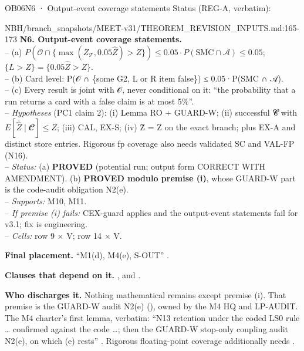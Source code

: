 \begin{card}{OB06}{N6 · Output-event coverage statements}
Status (REG-A, verbatim):  
\begin{stmt}{NBH/branch_snapshots/MEET-v31/THEOREM_REVISION_INPUTS.md:165-173}
\textbf{N6. Output-event coverage statements.}\\
– (a) $P(𝒪 ∩ \{\max(Z_{𝒯}, 0.05\hat{Z}) > Z\}) ≤ 0.05\cdot P(\mathrm{SMC} ∩ 𝒜) ≤ 0.05$; $\{L > Z\} = \{0.05\hat{Z} > Z\}$.\\
– (b) Card level: P(𝒪 ∩ \{some G2, L or R item false\}) ≤ 0.05·P(SMC ∩ 𝒜).\\
– (c) Every result is joint with 𝒪, never conditional on it: ``the probability that a run returns a card with a false claim is at most 5\%''.\\
– \emph{Hypotheses} (PC1 claim 2): (i) Lemma RO + GUARD-W; (ii) successful 𝓒 with $E[\bar{\hat{Z}} \mid 𝓒] ≤ Z$; (iii) CAL, EX-S; (iv) Ẑ = Z on the exact branch; plus EX-A and distinct store entries. Rigorous fp coverage also needs validated SC and VAL-FP (N16).\\
– \emph{Status:} (a) \textbf{PROVED} (potential run; output form CORRECT WITH AMENDMENT). (b) \textbf{PROVED modulo premise (i)}, whose GUARD-W part is the code-audit obligation N2(e).\\
– \emph{Supports:} M10, M11.\\
– \emph{If premise (i) fails:} CEX-guard applies and the output-event statements fail for v3.1; fix is engineering.\\
– \emph{Cells:} row 9 × V; row 14 × V.
\end{stmt}
\textbf{Final placement.} ``M1(d), M4(e), S-OUT'' .

\textbf{Clauses that depend on it.} ,  and .

\textbf{Who discharges it.} Nothing mathematical remains except premise (i). That premise is the GUARD-W audit N2(e) (), owned by the M4 HQ and LP-AUDIT. The M4 charter's first lemma, verbatim: ``N13 retention under the coded LS0 rule \ldots{} confirmed against the code \ldots; then the GUARD-W stop-only coupling audit N2(e), on which (e) rests'' . Rigorous floating-point coverage additionally needs .
\end{card}

